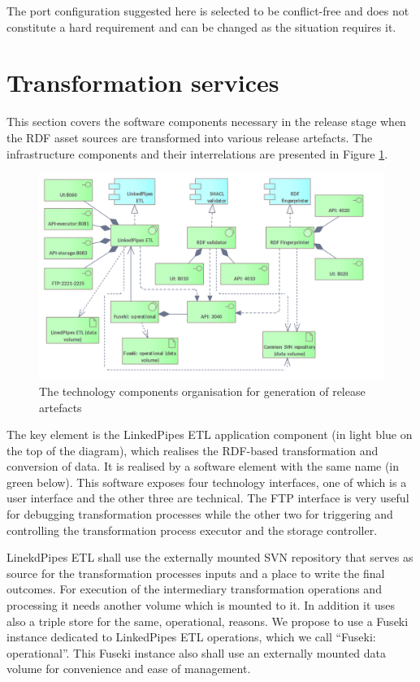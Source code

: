 	The port configuration suggested here is selected to be conflict-free and does not constitute a hard requirement and can be changed as the situation requires it. 
	
	\section{Transformation services}
	\label{sec:technology-view-transformation}
	
	This section covers the software components necessary in the release stage when the RDF asset sources are transformed into various release artefacts. The infrastructure components and their interrelations are presented in Figure \ref{fig:technology-view-transformation}. 
	
	\begin{figure}[!h]
		\centering
		\includegraphics[width=.9\textwidth]{images/infra-setup/transformation.png}
		\caption{The technology components organisation for generation of release artefacts}
		\label{fig:technology-view-transformation}
	\end{figure}

	The key element is the LinkedPipes ETL application component (in light blue on the top of the diagram), which realises the RDF-based transformation and conversion of data. It is realised by a software element with the same name (in green below). This software exposes four technology interfaces, one of which is a user interface and the other three are technical. The FTP interface is very useful for debugging transformation processes while the other two for triggering and controlling the transformation process executor and the storage controller. 
	
	LinekdPipes ETL shall use the externally mounted SVN repository that serves as source for the transformation processes inputs and a place to write the final outcomes. For execution of the intermediary transformation operations and processing it needs another volume which is mounted to it. In addition it uses also a triple store for the same, operational, reasons. We propose to use a Fuseki instance dedicated to LinkedPipes ETL operations, which we call ``Fuseki: operational''. This Fuseki instance also shall use an externally mounted data volume for convenience and ease of management. 
	
